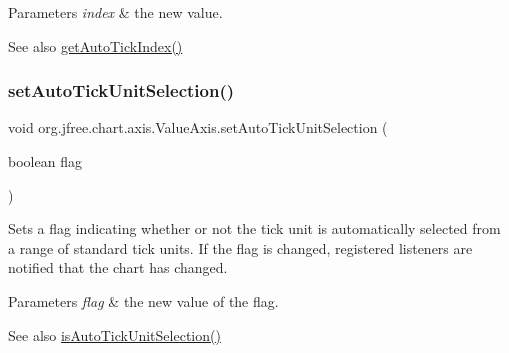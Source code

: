 \begin{DoxyParams}{Parameters}
{\em index} & the new value.\\
\hline
\end{DoxyParams}
\begin{DoxySeeAlso}{See also}
\mbox{\hyperlink{classorg_1_1jfree_1_1chart_1_1axis_1_1_value_axis_a385f69ce6843fd1b708610d3b2e5047a}{get\+Auto\+Tick\+Index()}} 
\end{DoxySeeAlso}
\mbox{\label{classorg_1_1jfree_1_1chart_1_1axis_1_1_value_axis_a7366393f75b07420136f449d351deb08}} 
\subsubsection{\texorpdfstring{set\+Auto\+Tick\+Unit\+Selection()}{setAutoTickUnitSelection()}\hspace{0.1cm}{\footnotesize\ttfamily [1/2]}}
{\footnotesize\ttfamily void org.\+jfree.\+chart.\+axis.\+Value\+Axis.\+set\+Auto\+Tick\+Unit\+Selection (\begin{DoxyParamCaption}\item[{boolean}]{flag }\end{DoxyParamCaption})}

Sets a flag indicating whether or not the tick unit is automatically selected from a range of standard tick units. If the flag is changed, registered listeners are notified that the chart has changed.


\begin{DoxyParams}{Parameters}
{\em flag} & the new value of the flag.\\
\hline
\end{DoxyParams}
\begin{DoxySeeAlso}{See also}
\mbox{\hyperlink{classorg_1_1jfree_1_1chart_1_1axis_1_1_value_axis_adc265a92cee6f4f50dcf0701f86d3cab}{is\+Auto\+Tick\+Unit\+Selection()}} 
\end{DoxySeeAlso}
\mbox{\label{classorg_1_1jfree_1_1chart_1_1axis_1_1_value_axis_a5cab45ce7f2a0eecd0940f206b42a1c6}} 
